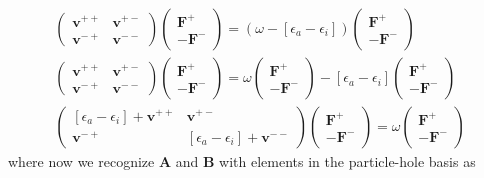 \documentclass[12pt]{article}
\begin{document}
\begin{align}
    \begin{pmatrix}
        \mathbf{v}^{++} & \mathbf{v}^{+-} \\
        \mathbf{v}^{-+} & \mathbf{v}^{--}
    \end{pmatrix}
    \begin{pmatrix}
        \mathbf{F}^{+} \\
        -\mathbf{F}^{-}
    \end{pmatrix} = \left(\omega - \left[\epsilon_{a}-\epsilon_{i}\right]\right) \begin{pmatrix}
        \mathbf{F}^{+} \\
        -\mathbf{F}^{-}
    \end{pmatrix}\\
\begin{pmatrix}
        \mathbf{v}^{++} & \mathbf{v}^{+-} \\
        \mathbf{v}^{-+} & \mathbf{v}^{--}
    \end{pmatrix}
    \begin{pmatrix}
        \mathbf{F}^{+} \\
        -\mathbf{F}^{-}
    \end{pmatrix} = \omega \begin{pmatrix}
        \mathbf{F}^{+} \\
        -\mathbf{F}^{-}
    \end{pmatrix}
- \left[\epsilon_{a}-\epsilon_{i}\right] \begin{pmatrix}
        \mathbf{F}^{+} \\
        -\mathbf{F}^{-}
    \end{pmatrix}\\
\begin{pmatrix}
    \left[\epsilon_{a}-\epsilon_{i}\right] + \mathbf{v}^{++} & \mathbf{v}^{+-} \\
    \mathbf{v}^{-+} & \left[\epsilon_{a}-\epsilon_{i}\right] + \mathbf{v}^{--}
\end{pmatrix}
\begin{pmatrix}
    \mathbf{F}^{+} \\
    -\mathbf{F}^{-}
\end{pmatrix}
= \omega \begin{pmatrix}
    \mathbf{F}^{+} \\
    -\mathbf{F}^{-}
\end{pmatrix}
\end{align}
where now we recognize $\mathbf{A}$ and $\mathbf{B}$ with elements in the particle-hole basis as
\end{document}
